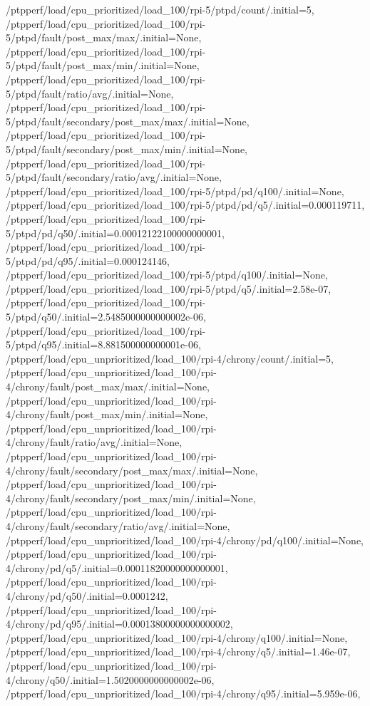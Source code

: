 {    /ptpperf/load/cpu_prioritized/load_100/rpi-5/ptpd/count/.initial=5,
    /ptpperf/load/cpu_prioritized/load_100/rpi-5/ptpd/fault/post_max/max/.initial=None,
    /ptpperf/load/cpu_prioritized/load_100/rpi-5/ptpd/fault/post_max/min/.initial=None,
    /ptpperf/load/cpu_prioritized/load_100/rpi-5/ptpd/fault/ratio/avg/.initial=None,
    /ptpperf/load/cpu_prioritized/load_100/rpi-5/ptpd/fault/secondary/post_max/max/.initial=None,
    /ptpperf/load/cpu_prioritized/load_100/rpi-5/ptpd/fault/secondary/post_max/min/.initial=None,
    /ptpperf/load/cpu_prioritized/load_100/rpi-5/ptpd/fault/secondary/ratio/avg/.initial=None,
    /ptpperf/load/cpu_prioritized/load_100/rpi-5/ptpd/pd/q100/.initial=None,
    /ptpperf/load/cpu_prioritized/load_100/rpi-5/ptpd/pd/q5/.initial=0.000119711,
    /ptpperf/load/cpu_prioritized/load_100/rpi-5/ptpd/pd/q50/.initial=0.00012122100000000001,
    /ptpperf/load/cpu_prioritized/load_100/rpi-5/ptpd/pd/q95/.initial=0.000124146,
    /ptpperf/load/cpu_prioritized/load_100/rpi-5/ptpd/q100/.initial=None,
    /ptpperf/load/cpu_prioritized/load_100/rpi-5/ptpd/q5/.initial=2.58e-07,
    /ptpperf/load/cpu_prioritized/load_100/rpi-5/ptpd/q50/.initial=2.5485000000000002e-06,
    /ptpperf/load/cpu_prioritized/load_100/rpi-5/ptpd/q95/.initial=8.881500000000001e-06,
    /ptpperf/load/cpu_unprioritized/load_100/rpi-4/chrony/count/.initial=5,
    /ptpperf/load/cpu_unprioritized/load_100/rpi-4/chrony/fault/post_max/max/.initial=None,
    /ptpperf/load/cpu_unprioritized/load_100/rpi-4/chrony/fault/post_max/min/.initial=None,
    /ptpperf/load/cpu_unprioritized/load_100/rpi-4/chrony/fault/ratio/avg/.initial=None,
    /ptpperf/load/cpu_unprioritized/load_100/rpi-4/chrony/fault/secondary/post_max/max/.initial=None,
    /ptpperf/load/cpu_unprioritized/load_100/rpi-4/chrony/fault/secondary/post_max/min/.initial=None,
    /ptpperf/load/cpu_unprioritized/load_100/rpi-4/chrony/fault/secondary/ratio/avg/.initial=None,
    /ptpperf/load/cpu_unprioritized/load_100/rpi-4/chrony/pd/q100/.initial=None,
    /ptpperf/load/cpu_unprioritized/load_100/rpi-4/chrony/pd/q5/.initial=0.00011820000000000001,
    /ptpperf/load/cpu_unprioritized/load_100/rpi-4/chrony/pd/q50/.initial=0.0001242,
    /ptpperf/load/cpu_unprioritized/load_100/rpi-4/chrony/pd/q95/.initial=0.00013800000000000002,
    /ptpperf/load/cpu_unprioritized/load_100/rpi-4/chrony/q100/.initial=None,
    /ptpperf/load/cpu_unprioritized/load_100/rpi-4/chrony/q5/.initial=1.46e-07,
    /ptpperf/load/cpu_unprioritized/load_100/rpi-4/chrony/q50/.initial=1.5020000000000002e-06,
    /ptpperf/load/cpu_unprioritized/load_100/rpi-4/chrony/q95/.initial=5.959e-06,
}
